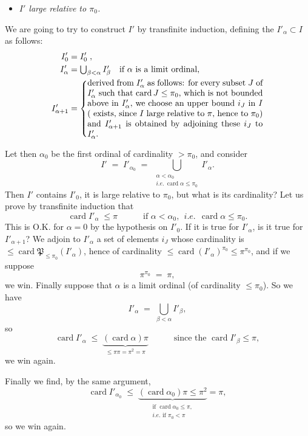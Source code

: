 \documentclass[11pt]{article}
\newcommand{\printedpage}[1]{\marginpar{\footnotesize p.~#1}}
\newcommand{\msp}[1]{\marginpar{\footnotesize [#1]}}
\newcommand{\card}{\operatorname{card}}
\begin{document}
\printedpage{44}

\begin{itemize}
\item[c)] \textit{$I'$ large relative to $\pi_0$.}
\end{itemize}


We are going to try to construct $I'$ by transfinite induction, defining the $I'_\alpha\subset I$ as follows:
\[
\begin{aligned}
I'_0 &= I'_0\;, \\
I'_\alpha &= \textstyle\bigcup_{\beta<\alpha} I'_\beta \quad \text{if $\alpha$ is a limit ordinal,} \\
I'_{\alpha+1} &= \left\{\parbox{0.6\textwidth}{derived from $I'_\alpha$ as follows: for every subset $J$ of $I'_\alpha$ such that $\card J\le\pi_0$, which is not bounded above in $I'_\alpha$, we choose an upper bound $i_J$ in $I$ ( exists, since $I$ large relative to $\pi$, hence to $\pi_0$) and $I'_{\alpha+1}$ is obtained by adjoining these $i_J$ to $I'_\alpha$.}\right.
\end{aligned}
\]

\msp{page 81}
Let then $\alpha_0$ be the first ordinal of cardinality $>\pi_0$, and consider
\[
I' \;=\; I'_{\alpha_0} \;=\; \bigcup\limits_{\substack{\alpha<\alpha_0\\ \textit{i.e.}\ \card\alpha\le\pi_0}} I'_\alpha .
\]
Then $I'$ contains $I'_0$, it is large relative to $\pi_0$, but what is its cardinality? Let us prove by transfinite induction that
\[
\card I'_\alpha \;\le\pi \qquad\quad \text{if } \alpha<\alpha_0,\ \ \textit{i.e.}\ \ \card\alpha\le\pi_0 .
\]
This is O.K. for $\alpha=0$ by the hypothesis on $I'_0$. If it is true for $I'_\alpha$, is it true for $I'_{\alpha+1}$? We adjoin to $I'_\alpha$ a set of elements $i_J$ whose cardinality is $\le\card\mathfrak{P}_{\le\pi_0}(I'_\alpha)$, hence of cardinality $\le\card(I'_\alpha)^{\pi_0}\le\pi^{\pi_0}$, and if we suppose
\[
\pi^{\pi_0} \;=\; \pi,
\]
we win. Finally suppose that $\alpha$ is a limit ordinal (of cardinality $\le\pi_0$). So we have
\[
I'_\alpha \;=\; \bigcup_{\beta<\alpha} I'_\beta ,
\]
so
\printedpage{45}
\msp{page 82}
\[
\card I'_\alpha \;\le\; \underbrace{(\card\alpha)\pi}_{\le\pi\pi=\pi^2=\pi} \qquad\quad \text{since the } \card I'_\beta\le\pi,
\]
we win again.

Finally we find, by the same argument,
\[
\card I'_{\alpha_0} \;\le\; \underbrace{(\card\alpha_0)\pi\le\pi^2}_{\substack{\text{if }\card\alpha_0\le\pi,\\ \textit{i.e.}\text{ if }\pi_0<\pi}} = \pi,
\]
so we win again.
\end{document}
